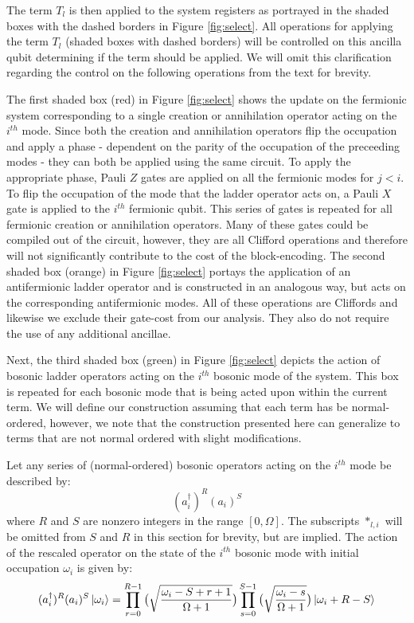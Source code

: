 The term $T_l$ is then applied to the system registers as portrayed in the shaded boxes with the dashed borders in Figure \ref{fig:select}.
All operations for applying the term $T_l$ (shaded boxes with dashed borders) will be controlled on this ancilla qubit determining if the term should be applied.
We will omit this clarification regarding the control on the following operations from the text for brevity.

The first shaded box (red) in Figure \ref{fig:select} shows the update on the fermionic system corresponding to a single creation or annihilation operator acting on the $i^{th}$ mode.
Since both the creation and annihilation operators flip the occupation and apply a phase - dependent on the parity of the occupation of the preceeding modes - they can both be applied using the same circuit.
To apply the appropriate phase, Pauli $Z$ gates are applied on all the fermionic modes for $j < i$.
To flip the occupation of the mode that the ladder operator acts on, a Pauli $X$ gate is applied to the $i^{th}$ fermionic qubit.
This series of gates is repeated for all fermionic creation or annihilation operators.
Many of these gates could be compiled out of the circuit, however, they are all Clifford operations and therefore will not significantly contribute to the cost of the block-encoding.
The second shaded box (orange) in Figure \ref{fig:select} portays the application of an antifermionic ladder operator and is constructed in an analogous way, but acts on the corresponding antifermionic modes.
All of these operations are Cliffords and likewise we exclude their gate-cost from our analysis.
They also do not require the use of any additional ancillae.

Next, the third shaded box (green) in Figure \ref{fig:select} depicts the action of bosonic ladder operators acting on the $i^{th}$ bosonic mode of the system.
This box is repeated for each bosonic mode that is being acted upon within the current term.
We will define our construction assuming that each term has be normal-ordered, however, we note that the construction presented here can generalize to terms that are not normal ordered with slight modifications.

Let any series of (normal-ordered) bosonic operators acting on the $i^{th}$ mode be described by:
\begin{equation}
    (a_i^\dagger)^R (a_i)^S
\end{equation}
where $R$ and $S$ are nonzero integers in the range $[0, \Omega]$.
The subscripts $*_{l, i}$ will be omitted from $S$ and $R$ in this section for brevity, but are implied.
The action of the rescaled operator on the state of the $i^{th}$ bosonic mode with initial occupation $\omega_i$ is given by:
\begin{equation}
    \label{eq:bosonic-operator-action}
    (a_i^\dagger)^R (a_i)^S \ket{\omega_i} = \prod_{r=0}^{R-1} \big( \sqrt{\frac{\omega_i - S + r + 1}{\Omega + 1}} \big) \prod_{s=0}^{S-1} \big( \sqrt{\frac{\omega_i - s}{\Omega + 1}} \big) \ket{\omega_i + R - S}
\end{equation}

